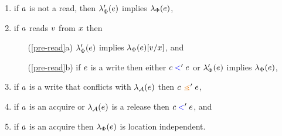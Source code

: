 \begin{definition}
\begin{enumerate}
\item\label{pre-write} if $a$ is not a read, then $\lambda_{\Phi}'(e)$
  implies $\lambda_{\Phi}(e)$,
\item\label{pre-read} if $a$ reads $v$ from $x$ then
  \begin{enumerate}
  \item[(\ref{pre-read}a)] $\lambda_{\Phi}'(e)$ implies $\lambda_{\Phi}(e)[v/x]$, and
  \item[(\ref{pre-read}b)] if $e$ is a write then either $c\mathrel{{\color{blue}<}}'e$
    or $\lambda_{\Phi}'(e)$ implies $\lambda_{\Phi}(e)$,
  \end{enumerate}
\item\label{pre-coherence} if $a$ is a write that conflicts with $\lambda_{\mathcal{A}}(e)$ 
    then $\cEv \gtN' \aEv$,
\item\label{pre-sync} if $a$ is an acquire or $\lambda_{\mathcal{A}}(e)$ is a release then $c \mathrel{{\color{blue}<}}' e$, and
\item\label{pre-acquire} if $a$ is an acquire then $\lambda_{\Phi}(e)$ is location independent.

\end{enumerate}
\end{definition}
